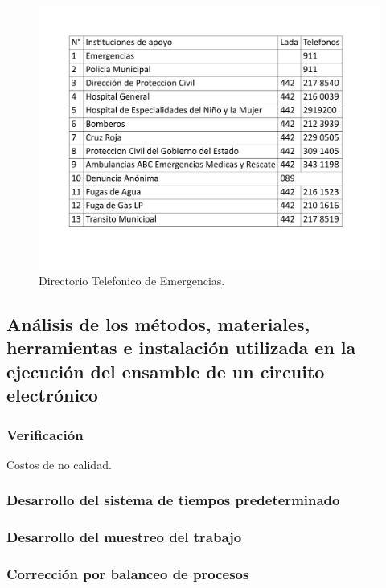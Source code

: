     \begin{figure}[H]
        \centering
        \includegraphics[scale=0.3]{21/img/directorioEmergecias.pdf}
        \caption{Directorio Telefonico de Emergencias.}
        \label{fig:directorioEmergencias}
    \end{figure}
    
    \subsection{Análisis de los métodos, materiales, herramientas e instalación utilizada en la ejecución del ensamble de un circuito electrónico}
    
    \subsubsection{Verificación}
    
    Costos de no calidad.
    \subsubsection{Desarrollo del sistema de tiempos predeterminado}
    \subsubsection{Desarrollo del muestreo del trabajo}
    \subsubsection{Corrección por balanceo de procesos}
